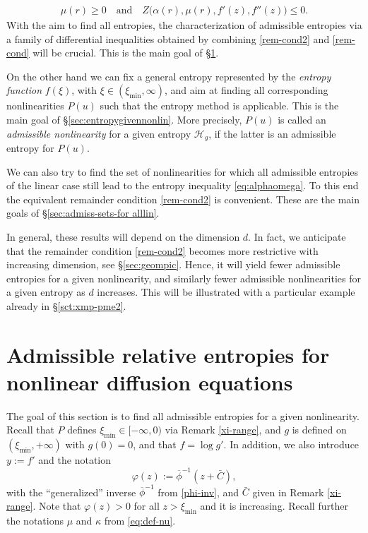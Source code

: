 \documentclass[reqno]{amsart}
\begin{document}
\begin{align}
    \label{rem-cond2c}
    \mu(r)\ge0 \quad \text{and}\quad Z\big(\alpha(r),\mu(r),f'(z),f''(z)\big)\le0. 
\end{align}
%
With the aim to find all entropies, the characterization of admissible entropies via a family of differential inequalities obtained by combining \eqref{rem-cond2} and \eqref{rem-cond} will be crucial. This is the main goal of \S \ref{sec-quasilin}. 

On the other hand we can fix a general entropy represented by the {\it entropy function} $f(\xi)$, with $\xi\in(\xi_{\min},\infty)$, 
and aim at finding all corresponding nonlinearities $P(u)$ such that the entropy method is applicable. This is the main goal of \S\ref{sec:entropygivennonlin}.  More precisely, $P(u)$ is called an \emph{admissible nonlinearity} for a given entropy  $\mathcal H_g$, if the latter is an admissible entropy for $P(u)$. 

We can also try to find the set of nonlinearities for which all admissible entropies of the linear case 
still lead to the entropy inequality \eqref{eq:alphaomega}.
To this end the equivalent remainder condition \eqref{rem-cond2} is convenient. These are the main goals of \S \ref{sec:admiss-sets-for alllin}.

In general, these results will depend on the dimension $d$. In fact, we anticipate that the remainder condition  \eqref{rem-cond2} becomes more restrictive with increasing dimension, see \S\ref{sec:geompic}. Hence, it will yield fewer admissible entropies for a given nonlinearity, and similarly fewer admissible nonlinearities for a given entropy as $d$ increases. This will be illustrated with a particular example already in \S\ref{sct:xmp-pme2}. 


\section{Admissible relative entropies for nonlinear diffusion equations}\label{sec-quasilin}
\setcounter{equation}{0}

The goal of this section is to find all admissible entropies for a given nonlinearity. Recall that $P$ defines $\xi_{\min}\in[-\infty,0)$ via Remark \ref{xi-range}, and $g$ is defined on $(\xi_{\min},+\infty)$ with $g(0)=0$, and that $f=\log g'$. In addition, we also introduce $y:=f'$ and the notation 
\begin{equation}\label{def-varphi}
\varphi(z):=\overline{\phi}^{-1}(z+\bar C), 
\end{equation}
with the ``generalized'' inverse $\overline{\phi}^{-1}$ from \eqref{phi-inv}, and $\bar C$ given in Remark \ref{xi-range}. Note that $\varphi(z)>0$ for all $z>\xi_{\min}$ and it is increasing. Recall further the notations $\mu$ and $\kappa$ from \eqref{eq:def-nu}.
\end{document}
